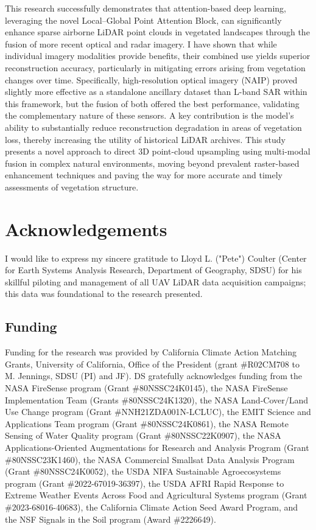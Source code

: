 \documentclass[12pt]{report}
\begin{document}
This research successfully demonstrates that attention-based deep learning, leveraging the novel Local--Global Point Attention Block, can significantly enhance sparse airborne LiDAR point clouds in vegetated landscapes through the fusion of more recent optical and radar imagery. I have shown that while individual imagery modalities provide benefits, their combined use yields superior reconstruction accuracy, particularly in mitigating errors arising from vegetation changes over time. Specifically, high-resolution optical imagery (NAIP) proved slightly more effective as a standalone ancillary dataset than L-band SAR within this framework, but the fusion of both offered the best performance, validating the complementary nature of these sensors. A key contribution is the model's ability to substantially reduce reconstruction degradation in areas of vegetation loss, thereby increasing the utility of historical LiDAR archives. This study presents a novel approach to direct 3D point-cloud upsampling using multi-modal fusion in complex natural environments, moving beyond prevalent raster-based enhancement techniques and paving the way for more accurate and timely assessments of vegetation structure.
\vspace{-10pt}

\chapter*{Acknowledgements}

I would like to express my sincere gratitude to Lloyd L. ("Pete") Coulter (Center for Earth Systems Analysis Research, Department of Geography, SDSU) for his skillful piloting and management of all UAV LiDAR data acquisition campaigns; this data was foundational to the research presented.

\section*{Funding}
\begin{sloppypar}
\small
Funding for the research was provided by California Climate Action Matching Grants, University of California, Office of the President (grant \#R02CM708 to M. Jennings, SDSU (PI) and JF). DS gratefully acknowledges funding from the NASA FireSense program (Grant \#80NSSC24K0145), the NASA FireSense Implementation Team (Grants \#80NSSC24K1320), the NASA Land-Cover/Land Use Change program (Grant \#NNH21ZDA001N-LCLUC), the EMIT Science and Applications Team program (Grant \#80NSSC24K0861), the NASA Remote Sensing of Water Quality program (Grant \#80NSSC22K0907), the NASA Applications-Oriented Augmentations for Research and Analysis Program (Grant \#80NSSC23K1460), the NASA Commercial Smallsat Data Analysis Program (Grant \#80NSSC24K0052), the USDA NIFA Sustainable Agroecosystems program (Grant \#2022-67019-36397), the USDA AFRI Rapid Response to Extreme Weather Events Across Food and Agricultural Systems program (Grant \#2023-68016-40683), the California Climate Action Seed Award Program, and the NSF Signals in the Soil program (Award \#2226649).
\end{sloppypar}
\end{document}
